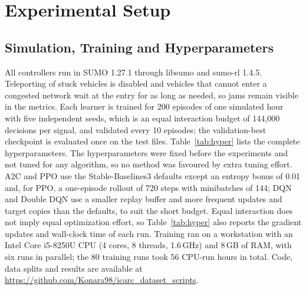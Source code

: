 \section{Experimental Setup}
\label{sec:setup}

\subsection{Simulation, Training and Hyperparameters}
All controllers run in SUMO 1.27.1 through libsumo and sumo-rl 1.4.5. Teleporting of stuck vehicles is disabled and vehicles that cannot enter a congested network wait at the entry for as long as needed, so jams remain visible in the metrics. Each learner is trained for 200 episodes of one simulated hour with five independent seeds, which is an equal interaction budget of 144{,}000 decisions per signal, and validated every 10 episodes; the validation-best checkpoint is evaluated once on the test files. Table~\ref{tab:hyper} lists the complete hyperparameters. The hyperparameters were fixed before the experiments and not tuned for any algorithm, so no method was favoured by extra tuning effort. A2C and PPO use the Stable-Baselines3 defaults except an entropy bonus of 0.01 and, for PPO, a one-episode rollout of 720 steps with minibatches of 144; DQN and Double DQN use a smaller replay buffer and more frequent updates and target copies than the defaults, to suit the short budget. Equal interaction does not imply equal optimization effort, so Table~\ref{tab:hyper} also reports the gradient updates and wall-clock time of each run. Training ran on a workstation with an Intel Core i5-8250U CPU (4 cores, 8 threads, 1.6\,GHz) and 8\,GB of RAM, with six runs in parallel; the 80 training runs took 56 CPU-run hours in total. Code, data splits and results are available at \url{https://github.com/Konara98/icarc_dataset_scripts}.

